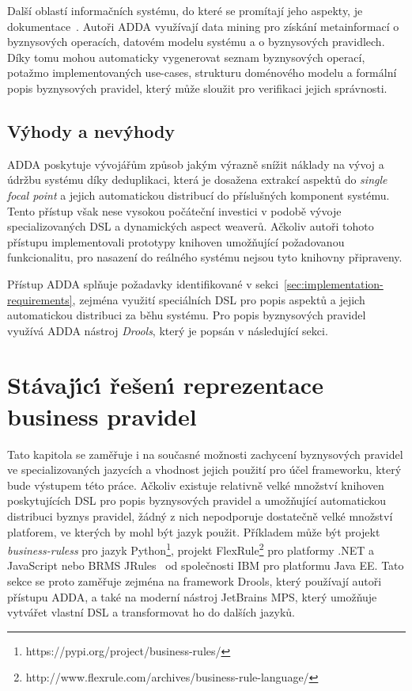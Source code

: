 Další oblastí informačních systému, do které se promítají jeho aspekty,
je dokumentace~\cite{cemus2017automated}. Autoři \gls{ADDA}
využívají data mining pro získání metainformací o byznysových operacích,
datovém modelu systému a o byznysových pravidlech. Díky tomu mohou
automaticky vygenerovat seznam byznysových operací, potažmo implementovaných
use-cases, strukturu doménového modelu a formální popis byznysových pravidel,
který může sloužit pro verifikaci jejich správnosti.

\subsection{Výhody a nevýhody}

\gls{ADDA} poskytuje vývojářům způsob jakým výrazně snížit náklady na vývoj a údržbu
systému díky deduplikaci, která je dosažena extrakcí aspektů
do \textit{single focal point} a jejich automatickou distribucí do
příslušných komponent systému. Tento přístup však nese vysokou počáteční investici v
podobě vývoje specializovaných \gls{DSL} a dynamických aspect weaverů.
Ačkoliv autoři tohoto přístupu implementovali prototypy knihoven umožňující
požadovanou funkcionalitu, pro nasazení do reálného systému
nejsou tyto knihovny připraveny.

Přístup \gls{ADDA} splňuje požadavky identifikované v sekci~\ref{sec:implementation-requirements},
zejména využití speciálních \gls{DSL} pro popis aspektů a
jejich automatickou distribuci za běhu systému. Pro popis byznysových pravidel
využívá \gls{ADDA} nástroj \textit{Drools}, který je popsán v následující sekci.

\section{Stávaj\'{\i}c\'{\i} řešen\'{\i} reprezentace business pravidel}\label{sec:business-rule-dsl}

Tato kapitola se zaměřuje i na současné možnosti zachycení
byznysových pravidel ve specializovaných jazycích a vhodnost jejich použití
pro účel frameworku, který bude výstupem této práce.
Ačkoliv existuje relativně velké množství knihoven poskytujících
\gls{DSL} pro popis byznysových pravidel a umožňující automatickou
distribuci byznys pravidel, žádný z nich nepodporuje dostatečně velké množství
platforem, ve kterých by mohl být jazyk použit. Příkladem může být projekt \textit{business-ruless}
pro jazyk Python\footnote{https://pypi.org/project/business-rules/}, projekt
FlexRule\footnote{http://www.flexrule.com/archives/business-rule-language/} pro platformy .NET a
JavaScript nebo \gls{BRMS} JRules~\cite{boyer2011ibm} od společnosti \gls{IBM} pro platformu \gls{Java EE}.
Tato sekce se proto zaměřuje zejména na framework Drools, který používají autoři přístupu \gls{ADDA},
a také na moderní nástroj JetBrains MPS, který umožňuje vytvářet vlastní \gls{DSL} a transformovat
ho do dalších jazyků.

